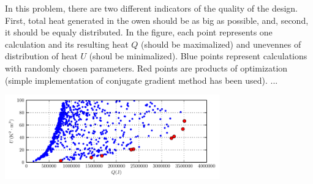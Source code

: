 \documentclass[portrait, a1paper, fontscale=0.5]{baposter}
\begin{document}
\begin{poster}
{\begin{center}
\begin{minipage}{26em}
	\end{minipage}
\end{center}

\begin{center}
	\begin{minipage}{25em}
		In this problem, there are two different indicators of the quality of the design. First, total heat generated in the 
owen should be as big as possible, and, second, it should be equaly distributed. In the figure, each point represents one calculation 
and its resulting heat $Q$ (should be maximalized) and unevennes of distribution of heat $U$ (shoul be minimalized). Blue points represent
calculations with randomly chosen parameters. Red points are products of optimization (simple implementation of conjugate gradient method has
been used). ...
	\end{minipage}
	\begin{minipage}{25em}
		\centering
		\includegraphics[width=25em]{optimization/results.pdf}
	\end{minipage}
\end{center}
}

\end{poster}
\end{document}
